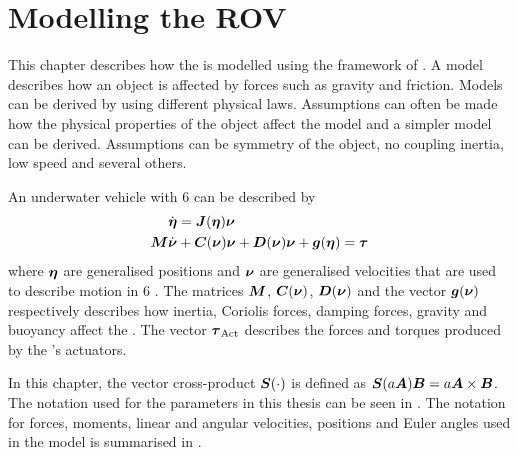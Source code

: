 \chapter{Modelling the ROV} \label{cha:modelling}
This chapter describes how the \abbrROV is modelled using the framework of \citet{fossen2011}. A model describes how an object is affected by forces such as gravity and friction. Models can be derived by using different physical laws. Assumptions can often be made how the physical properties of the object affect the model and a simpler model can be derived. Assumptions can be symmetry of the object, no coupling inertia, low speed and several others. 

An underwater vehicle with 6 \abbrDOF can be described by
\begin{align}
\dot{\boldsymbol{\eta}}& = \boldsymbol{J}(\boldsymbol{\eta})\boldsymbol{\nu} \\\label{eq:model}
 \boldsymbol{M} \dot{\boldsymbol{\nu}} &+ \boldsymbol{C}(\boldsymbol{\nu})\boldsymbol{\nu} + \boldsymbol{D}(\boldsymbol{\nu})\boldsymbol{\nu} + \boldsymbol{g}(\boldsymbol{\eta}) = \boldsymbol{\tau} 
\end{align}
where $\boldsymbol{\eta}$ are generalised positions and $\boldsymbol{\nu}$ are generalised velocities that are used to describe motion in 6 \abbrDOF \citep[p. 15]{fossen2011}. The matrices $\boldsymbol{M}$, $\boldsymbol{C}(\boldsymbol{\nu})$, $\boldsymbol{D}(\boldsymbol{\nu})$ and the vector $\boldsymbol{g}(\boldsymbol{\nu})$ respectively describes how inertia, Coriolis forces, damping forces, gravity and buoyancy affect the \abbrROV. The vector $\boldsymbol{\tau}_{\text{Act}}$ describes the forces and torques produced by the \abbrROV's actuators.
 
In this chapter, the vector cross-product $\boldsymbol{S}(\cdot)$ is defined as $\boldsymbol{S}(a\boldsymbol{A}) \boldsymbol{B} = a\boldsymbol{A} \times \boldsymbol{B}$. The notation used for the parameters in this thesis can be seen in . The notation for forces, moments, linear and angular velocities, positions and Euler angles used in the model is summarised in . 

